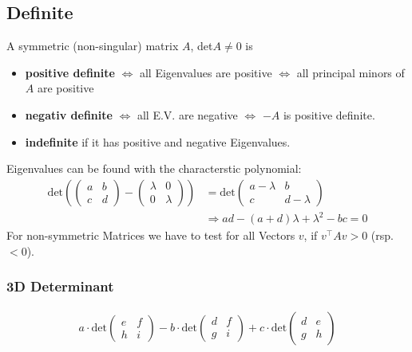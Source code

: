 \documentclass[a4paper,fontsize = 10pt]{article}
\begin{document}
\subsection{Definite}
A symmetric (non-singular) matrix $A$, det$A \ne 0$ is
\begin{itemize}
  \item \textbf{positive definite} $\iff$ all Eigenvalues are positive $\iff$ all principal minors of $A$ are positive
  \item \textbf{negativ definite} $\iff$ all E.V. are negative $\iff$ $-A$ is positive definite.
  \item \textbf{indefinite} if it has positive and negative Eigenvalues.
\end{itemize}
Eigenvalues can be found with the characterstic polynomial:
\begin{align*}
  \text{det} \left(
  \begin{pmatrix}
    a & b\\
    c & d
  \end{pmatrix}
  -
  \begin{pmatrix}
    \lambda & 0\\
    0 & \lambda
  \end{pmatrix}
  \right)
  &=
  \text{det}
  \begin{pmatrix}
    a - \lambda & b\\
    c & d - \lambda
  \end{pmatrix}\\
  &\Rightarrow ad - (a + d) \lambda + \lambda^2 - bc = 0
\end{align*}
For non-symmetric Matrices we have to test for all Vectors \(v\), if \(v^\top A v > 0\) (rsp. \(< 0\)).
\subsubsection*{3D Determinant}
\begin{align*}
  a \cdot \text{det}
  \begin{pmatrix}
    e & f\\
    h & i
  \end{pmatrix}
  - b \cdot \text{det}
  \begin{pmatrix}
    d & f\\
    g & i
  \end{pmatrix}
  + c \cdot \text{det}
  \begin{pmatrix}
    d & e\\
    g & h
  \end{pmatrix}
\end{align*}
\end{document}
